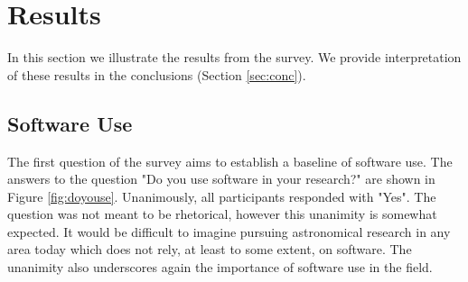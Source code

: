 \section{Results}
\label{sec:res}

In this section we illustrate the results from the survey. We provide interpretation of these results in the conclusions (Section \ref{sec:conc}).

\subsection{Software Use}

The first question of the survey aims to establish a baseline of software use. The answers to the question "Do you use software in your research?" are shown in Figure \ref{fig:doyouse}. Unanimously, all participants responded with "Yes". The question was not meant to be rhetorical, however this unanimity is somewhat expected. It would be difficult to imagine pursuing astronomical research in any area today which does not rely, at least to some extent, on software. The unanimity also underscores again the importance of software use in the field.
